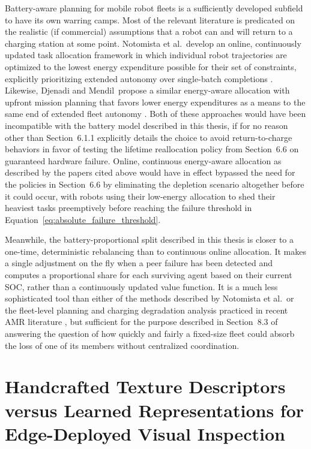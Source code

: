 Battery-aware planning for mobile robot fleets is a sufficiently developed subfield to have its own warring camps. Most of the relevant literature is predicated on the realistic (if commercial) assumptions that a robot can and will return to a charging station at some point. Notomista et al.\ develop an online, continuously updated task allocation framework in which individual robot trajectories are optimized to the lowest energy expenditure possible for their set of constraints, explicitly prioritizing extended autonomy over single-batch completions \cite{notomista2022resilient}. Likewise, Djenadi and Mendil\ propose a similar energy-aware allocation with upfront mission planning that favors lower energy expenditures as a means to the same end of extended fleet autonomy \cite{djenadi2022energyaware}. Both of these approaches would have been incompatible with the battery model described in this thesis, if for no reason other than Section~6.1.1 explicitly details the choice to avoid return-to-charge behaviors in favor of testing the lifetime reallocation policy from Section~6.6 on guaranteed hardware failure. Online, continuous energy-aware allocation as described by the papers cited above would have in effect bypassed the need for the policies in Section~6.6 by eliminating the depletion scenario altogether before it could occur, with robots using their low-energy allocation to shed their heaviest tasks preemptively before reaching the failure threshold in Equation~\eqref{eq:absolute_failure_threshold}.

Meanwhile, the battery-proportional split described in this thesis is closer to a one-time, deterministic rebalancing than to continuous online allocation. It makes a single adjustment on the fly when a peer failure has been detected and computes a proportional share for each surviving agent based on their current SOC, rather than a continuously updated value function. It is a much less sophisticated tool than either of the methods described by Notomista et al.\ or the fleet-level planning and charging degradation analysis practiced in recent AMR literature \cite{djenadi2022energyaware}, but sufficient for the purpose described in Section~8.3 of answering the question of how quickly and fairly a fixed-size fleet could absorb the loss of one of its members without centralized coordination.

\section{Handcrafted Texture Descriptors versus Learned Representations for Edge-Deployed Visual Inspection}

